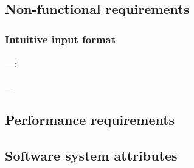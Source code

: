 \documentclass[12pt,a4paper]{article}
\begin{document}
\subsection{Non-functional requirements}
\setcounter{paragraph}{2}
\subsubsection{Intuitive input format}
\paragraph{---:} ---


\subsection{Performance requirements}

\subsection{Software system attributes}
\end{document}
